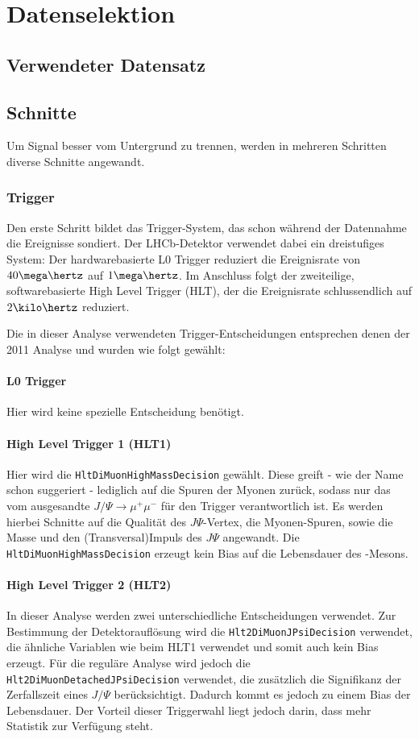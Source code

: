 \chapter{Datenselektion}
\section{Verwendeter Datensatz}
\section{Schnitte}
Um Signal besser vom Untergrund zu trennen, werden in mehreren Schritten diverse Schnitte angewandt.
\subsection{Trigger}
Den erste Schritt bildet das Trigger-System, das schon während der Datennahme die Ereignisse sondiert. Der LHCb-Detektor verwendet dabei ein dreistufiges System: Der hardwarebasierte \glqq L0 Trigger \grqq reduziert die Ereignisrate von $40\mega\hertz$ auf $1\mega\hertz$. Im Anschluss folgt der zweiteilige, softwarebasierte \glqq High Level Trigger \grqq (HLT), der die Ereignisrate schlussendlich auf $2\kilo\hertz$ reduziert.\cite{trigger} 

Die in dieser Analyse verwendeten Trigger-Entscheidungen entsprechen denen der 2011 Analyse \cite{lhcb-paper} und wurden wie folgt gewählt:

\subsubsection{L0 Trigger}
Hier wird keine spezielle Entscheidung benötigt.

\subsubsection{High Level Trigger 1 (HLT1)}
Hier wird die \texttt{HltDiMuonHighMassDecision} gewählt. Diese greift - wie der Name schon suggeriert - lediglich auf die Spuren der Myonen zurück, sodass nur das vom \Bd ausgesandte $J/\Psi \rightarrow \mu^+\mu^-$ für den Trigger verantwortlich ist. Es werden hierbei Schnitte auf die Qualität des $J\Psi$-Vertex, die Myonen-Spuren, sowie die Masse und den (Transversal)Impuls des $J\Psi$ angewandt. Die \texttt{HltDiMuonHighMassDecision} erzeugt kein Bias auf die Lebensdauer des \Bd-Mesons.

\subsubsection{High Level Trigger 2 (HLT2)}
In dieser Analyse werden zwei unterschiedliche Entscheidungen verwendet. Zur Bestimmung der Detektorauflösung wird die \texttt{Hlt2DiMuonJPsiDecision} verwendet, die ähnliche Variablen wie beim HLT1 verwendet und somit auch kein Bias erzeugt. Für die reguläre Analyse wird jedoch die \texttt{Hlt2DiMuonDetachedJPsiDecision} verwendet, die zusätzlich die Signifikanz der Zerfallszeit eines $J/\Psi$ berücksichtigt. Dadurch kommt es jedoch zu einem Bias der Lebensdauer. Der Vorteil dieser Triggerwahl liegt jedoch darin, dass mehr Statistik zur Verfügung steht.

